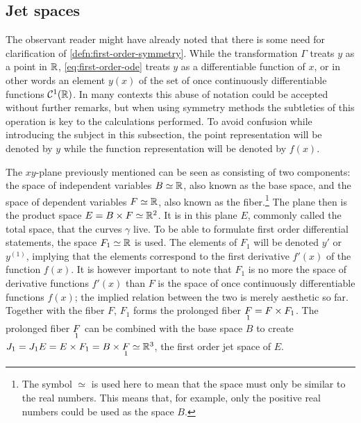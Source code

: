 \subsection{Jet spaces} \label{subsec:jet-spaces}

The observant reader might have already noted that there is some need for clarification of \cref{defn:first-order-symmetry}.
While the transformation \(\Gamma\) treats \(y\) as a point in \(\reals\), \cref{eq:first-order-ode} treats \(y\) as a differentiable function of \(x\), or in other words an element \(y(x)\) of the set of once continuously differentiable functions \(\mathcal{C}^1(\reals)\).
In many contexts this abuse of notation could be accepted without further remarks, but when using symmetry methods the subtleties of this operation is key to the calculations performed.
To avoid confusion while introducing the subject in this subsection, the point representation will be denoted by \(y\) while the function representation will be denoted by \(f(x)\).

The \(xy\)-plane previously mentioned can be seen as consisting of two components: the space of independent variables \(B \simeq \reals\), also known as the base space, and the space of dependent variables \(F \simeq \reals\), also known as the fiber.\footnote{The symbol \(\simeq\) is used here to mean that the space must only be similar to the real numbers. This means that, for example, only the positive real numbers could be used as the space \(B\).}
The plane then is the product space \(E = B \times F \simeq \reals^2\).
It is in this plane \(E\), commonly called the total space, that the curves \(\gamma\) live.
To be able to formulate first order differential statements, the space \(F_1 \simeq \reals\) is used.
The elements of \(F_1\) will be denoted \(y'\) or \(y^{(1)}\), implying that the elements correspond to the first derivative \(f'(x)\) of the function \(f(x)\).
It is however important to note that \(F_1\) is no more the space of derivative functions \(f'(x)\) than \(F\) is the space of once continuously differentiable functions \(f(x)\); the implied relation between the two is merely aesthetic so far.
Together with the fiber \(F\), \(F_1\) forms the prolonged fiber \(\prolong{F}{1} = F \times F_1\).
The prolonged fiber \(\prolong{F}{1}\) can be combined with the base space \(B\) to create \(J_1 = J_1 E = E \times F_1 = B \times \prolong{F}{1} \simeq \reals^3\), the first order jet space of \(E\).%

